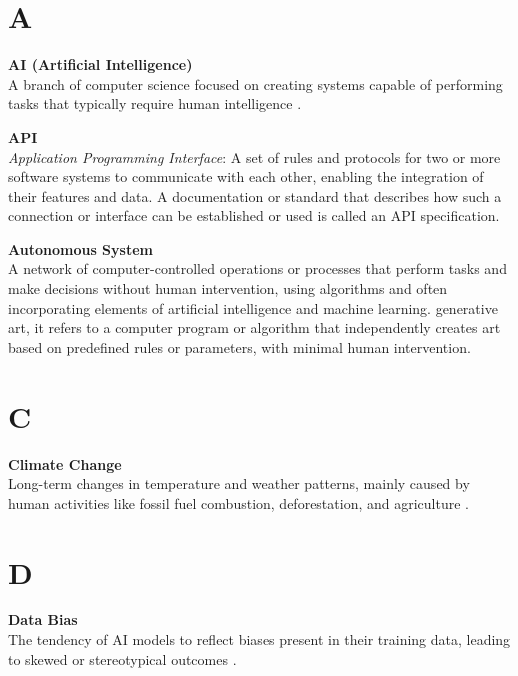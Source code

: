 \section*{A}
\noindent \textbf{AI (Artificial Intelligence)}\\
\noindent A branch of computer science focused on creating systems capable of performing tasks that typically require human intelligence \parencite{Broussard2019}.

\vspace{3mm}

\noindent \textbf{API}\\
\noindent \textit{Application Programming Interface}: A set of rules and protocols for two or more software systems to communicate with each other, enabling the integration of their features and data. A documentation or standard that describes how such a connection or interface can be established or used is called an API specification.

\vspace{3mm}

\noindent \textbf{Autonomous System}\\
\noindent A network of computer-controlled operations or processes that perform tasks and make decisions without human intervention, using algorithms and often incorporating elements of artificial intelligence and machine learning.  generative art, it refers to a computer program or algorithm that independently creates art based on predefined rules or parameters, with minimal human intervention.

\section*{C}
\noindent \textbf{Climate Change}\\
\noindent Long-term changes in temperature and weather patterns, mainly caused by human activities like fossil fuel combustion, deforestation, and agriculture \parencite{UNClimateChange}.

\section*{D}
\noindent \textbf{Data Bias}\\
\noindent The tendency of AI models to reflect biases present in their training data, leading to skewed or stereotypical outcomes \parencite{Mehrabi2022}.

\vspace{3mm}

